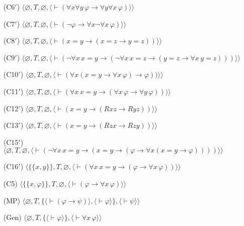 \begin{itemize}
\begin{itemize}
      \item[(C6$'$)] $\langle\varnothing,T,
               \varnothing,
               \langle \vdash(\forall x\forall y\,\varphi\to
                 \forall y\forall x\,\varphi)\rangle\rangle$
      \item[(C7$'$)] $\langle\varnothing,T,
               \varnothing,
               \langle \vdash(\lnot\varphi\to\forall x\lnot\forall x\,\varphi
                 )\rangle\rangle$
      \item[(C8$'$)] $\langle\varnothing,T,
               \varnothing,
               \langle \vdash(x=y\to(x=z\to y=z))\rangle\rangle$
      \item[(C9$'$)] $\langle\varnothing,T,
               \varnothing,
               \langle \vdash(\lnot\forall x\, x=y\to(\lnot\forall x\, x=z\to
                 (y=z\to\forall x\, y=z)))\rangle\rangle$
      \item[(C10$'$)] $\langle\varnothing,T,
               \varnothing,
               \langle \vdash(\forall x(x=y\to\forall x\,\varphi)\to
                 \varphi))\rangle\rangle$
      \item[(C11$'$)] $\langle\varnothing,T,
               \varnothing,
               \langle \vdash(\forall x\, x=y\to(\forall x\,\varphi
               \to\forall y\,\varphi))\rangle\rangle$
      \item[(C12$'$)] $\langle\varnothing,T,
               \varnothing,
               \langle \vdash(x=y\to(Rxz\to Ryz))\rangle\rangle$
      \item[(C13$'$)] $\langle\varnothing,T,
               \varnothing,
               \langle \vdash(x=y\to(Rzx\to Rzy))\rangle\rangle$
      \item[(C15$'$)] $\langle\varnothing,T,
               \varnothing,
               \langle \vdash(\lnot\forall x\, x=y\to(x=y\to(\varphi
                 \to\forall x(x=y\to\varphi))))\rangle\rangle$
      \item[(C16$'$)] $\langle\{\{x,y\}\},T,
               \varnothing,
               \langle \vdash(\forall x\, x=y\to(\varphi\to\forall x\,\varphi)
                 )\rangle\rangle$
      \item[(C5)] $\langle\{\{x,\varphi\}\},T,\varnothing,
               \langle \vdash(\varphi\to\forall x\,\varphi)
               \rangle\rangle$
      \item[(MP)] $\langle\varnothing,T,
               \{\langle\vdash(\varphi\to\psi)\rangle,
                 \langle\vdash\varphi\rangle\},
               \langle\vdash\psi\rangle\rangle$
      \item[(Gen)] $\langle\varnothing,T,
               \{\langle\vdash\varphi\rangle\},
               \langle\vdash\forall x\,\varphi\rangle\rangle$
    \end{itemize}
\end{itemize}

